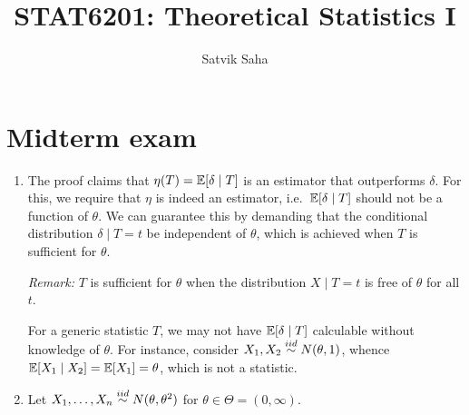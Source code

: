 \documentclass[11pt]{article}
\title{\bfseries STAT6201: Theoretical Statistics I}
\author{Satvik Saha}
\date{}
\begin{document}
    \maketitle

    \section*{Midterm exam}

    \begin{enumerate}
    \setlength\itemsep{1.5em}

        \item The proof claims that $\eta(T) = \mathbb{E}[\delta \mid T]$ is an
        estimator that outperforms $\delta$.
        For this, we require that $\eta$ is indeed an estimator, i.e.\
        $\mathbb{E}[\delta\mid T]$ should not be a function of $\theta$.
        We can guarantee this by demanding that the conditional distribution
        $\delta \mid T = t$ be independent of $\theta$, which is achieved when
        $T$ is sufficient for $\theta$.

        \emph{Remark:} $T$ is sufficient for $\theta$ when the distribution
        $X\mid T = t$ is free of $\theta$ for all $t$.

        For a generic statistic $T$, we may not have $\mathbb{E}[\delta\mid T]$
        calculable without knowledge of $\theta$.
        For instance, consider $X_1, X_2 \overset{iid}{\sim} N(\theta, 1)$, whence
        $\mathbb{E}[X_1\mid X_2] = \mathbb{E}[X_1] = \theta$, which is not a statistic.



        \item Let $X_1, \dots, X_n \overset{iid}{\sim} N(\theta, \theta^2)$ for $\theta \in
        \Theta = (0, \infty)$.


\end{enumerate}
\end{document}
